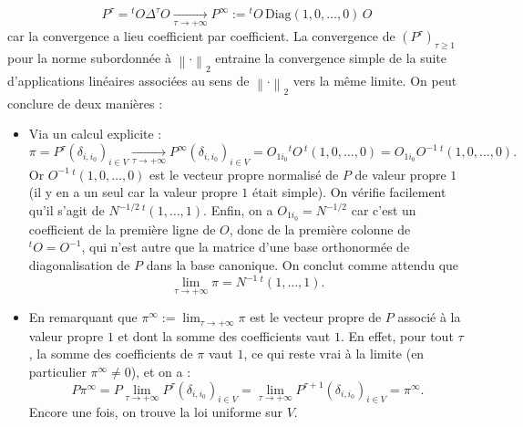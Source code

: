 \documentclass[11pt]{article}
\newcommand{\norm}[1]{\left\lVert #1 \right\rVert}
\renewcommand{\geq}{\geqslant}
\theoremstyle{plain}
\begin{document}
\begin{description}
    \begin{equation*}\label{eq:limite_P}
    P^{\tau} = {}^{t}O\Delta^{\tau}O \xrightarrow[\tau \to +\infty]{} P^{\infty} := {}^{t}O \,\mathrm{Diag}(1,0, \ldots, 0)\,O
    \end{equation*}
    car la convergence a lieu coefficient par coefficient. La convergence de $(P^{\tau})_{\tau \geq 1}$ pour la norme subordonnée à $\norm{\cdot}_2$ entraine la convergence simple de la suite d'applications linéaires associées au sens de $\norm{\cdot}_2$ vers la même limite.
    On peut conclure de deux manières :
    \begin{itemize}
        \item Via un calcul explicite :
        \begin{equation*}
        \pi = P^{\tau}(\delta_{i,i_0})_{i \in V} \xrightarrow[\tau \to +\infty]{} P^{\infty}(\delta_{i,i_0})_{i \in V} = O_{1i_0} {}^{t}O \,^{t}(1, 0, \ldots, 0) = O_{1i_0} O^{-1} \,^{t}(1, 0, \ldots, 0).
        \end{equation*}
        Or $O^{-1} \,^{t}(1, 0, \ldots, 0)$ est le vecteur propre normalisé de $P$ de valeur propre $1$ (il y en a un seul car la valeur propre $1$ était simple). On vérifie facilement qu'il s'agit de $N^{-1/2} \,{}^{t}(1, \ldots, 1)$. Enfin, on a $O_{1i_0} = N^{-1/2}$ car c'est un coefficient de la première ligne de $O$, donc de la première colonne de $^{t}O = O^{-1}$, qui n'est autre que la matrice d'une base orthonormée de diagonalisation de $P$ dans la base canonique. On conclut comme attendu que 
        \begin{equation}\label{eq:pi_infini}
        \lim_{\tau \to +\infty} \pi = N^{-1}\,^{t}(1, \ldots, 1).
        \end{equation}
        \item En remarquant que $\pi^{\infty} := \displaystyle\lim_{\tau \to +\infty}\pi$ est le vecteur propre de $P$ associé à la valeur propre $1$ et dont la somme des coefficients vaut $1$. En effet, pour tout $\tau$, la somme des coefficients de $\pi$ vaut $1$, ce qui reste vrai à la limite (en particulier $\pi^{\infty} \neq 0$), et on a :
        $$P \pi^{\infty} = P\lim_{\tau \to +\infty} P^{\tau}(\delta_{i,i_0})_{i \in V} = \lim_{\tau \to +\infty} P^{\tau + 1}(\delta_{i,i_0})_{i \in V} = \pi^{\infty}.$$
        Encore une fois, on trouve la loi uniforme sur $V$.
    \end{itemize} 
    
    


\end{description}
\end{document}
